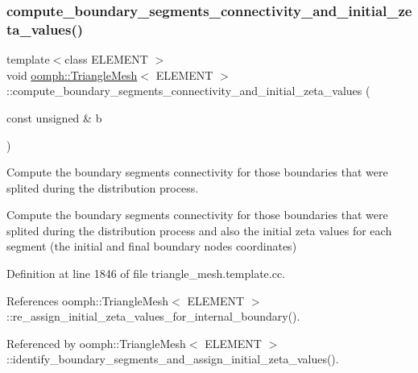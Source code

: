 \subsubsection{\texorpdfstring{compute\+\_\+boundary\+\_\+segments\+\_\+connectivity\+\_\+and\+\_\+initial\+\_\+zeta\+\_\+values()}{compute\_boundary\_segments\_connectivity\_and\_initial\_zeta\_values()}}
{\footnotesize\ttfamily template$<$class E\+L\+E\+M\+E\+NT $>$ \\
void \hyperlink{classoomph_1_1TriangleMesh}{oomph\+::\+Triangle\+Mesh}$<$ E\+L\+E\+M\+E\+NT $>$\+::compute\+\_\+boundary\+\_\+segments\+\_\+connectivity\+\_\+and\+\_\+initial\+\_\+zeta\+\_\+values (\begin{DoxyParamCaption}\item[{const unsigned \&}]{b }\end{DoxyParamCaption})}



Compute the boundary segments connectivity for those boundaries that were splited during the distribution process. 

Compute the boundary segments connectivity for those boundaries that were splited during the distribution process and also the initial zeta values for each segment (the initial and final boundary nodes coordinates) 

Definition at line 1846 of file triangle\+\_\+mesh.\+template.\+cc.



References oomph\+::\+Triangle\+Mesh$<$ E\+L\+E\+M\+E\+N\+T $>$\+::re\+\_\+assign\+\_\+initial\+\_\+zeta\+\_\+values\+\_\+for\+\_\+internal\+\_\+boundary().



Referenced by oomph\+::\+Triangle\+Mesh$<$ E\+L\+E\+M\+E\+N\+T $>$\+::identify\+\_\+boundary\+\_\+segments\+\_\+and\+\_\+assign\+\_\+initial\+\_\+zeta\+\_\+values().

\mbox{\label{classoomph_1_1TriangleMesh_a42ae047a452ed3bc897deabe2c188fcf}} 
